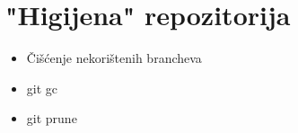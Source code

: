 \chapter*{"Higijena" repozitorija}

\begin{itemize}
   \item Čišćenje nekorištenih brancheva
   \item git gc
   \item git prune
\end{itemize}


